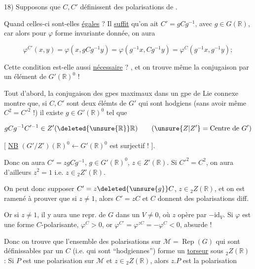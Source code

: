 
18) Supposons que $C,C'$ \deleted{\unsure{$\in$}}  définissent des polarisations de  .

Quand celles-ci sont-elles \uline{égales} ? Il \uline{suffit} qu'on ait $C'=gCg^{-1}$, avec $g\in G(\mathbb R)$, car alors pour $\varphi$ forme invariante donnée, on aura

\[
\varphi^{C'}(x,y)=\varphi(x,gCg^{-1}y)=\varphi(g^{-1}x,Cg^{-1}y)=\varphi^C(g^{-1}x,g^{-1}y);
\]

Cette condition est-elle aussi \uline{nécessaire} ? ,   et on trouve même \unsure{$=$} la conjugaison par un élément de $G'(\mathbb R)^0$ !


Tout d'abord, la conjugaison des gpes maximaux dans un gpe de Lie connexe montre que,  si $C,C'$ sont deux élémts de $G'$ qui sont hodgiens (sans avoir même $C^2=C'^2$ !) il existe $g\in G'(\mathbb R)^0$ tel que

\[
gCg^{-1}C'^{-1}\in Z'(\deleted{\unsure{\mathbb R}}\mathbb R)\qquad (\unsure{Z|Z'}=\text{Centre de }G')
\]

[ \uline{NB} $(G'/Z')(\mathbb R)^0\longleftarrow G'(\mathbb R)^0$ est surjectif ! ].

Donc on aura $C'=zgCg^{-1}$, $g\in G'(\mathbb R)^0$, $z\in Z'(\mathbb R)$. Si $C'^2=C^2$, on aura d'ailleurs $z^2=1$ i.e. $z\in {}_2Z'(\mathbb R)$.

 On peut donc supposer $C'=z\deleted{\unsure{g}}C$, $z\in {}_2Z(\mathbb R)$, et on est ramené à prouver que si $z\ne1$, alors $C'=zC$ et $C$ donnent des polarisations diff.

Or si $z\ne1$, il y aura une repr. de $G$ dans un $V\ne0$, où $z$ opère par $-\mathrm{id}_V$. Si $\varphi$ est une forme $C$-polarisante, $\varphi^C>0$, or $\varphi^{C'}=\varphi^{zC}=-\varphi^C<0$, absurde !

Donc on trouve que l'ensemble des polarisations sur $\mathcal M=\operatorname{Rep}(G)$ qui sont définissables par un $C$ (i.e. qui sont ``hodgiennes'') forme un \uline{torseur} sous $ {}_2Z(\mathbb R)$ : Si  $P$ est une polarisation sur $\mathcal M$ et $z\in {}_2Z(\mathbb R)$, alors $z.P$ est la polarisation

